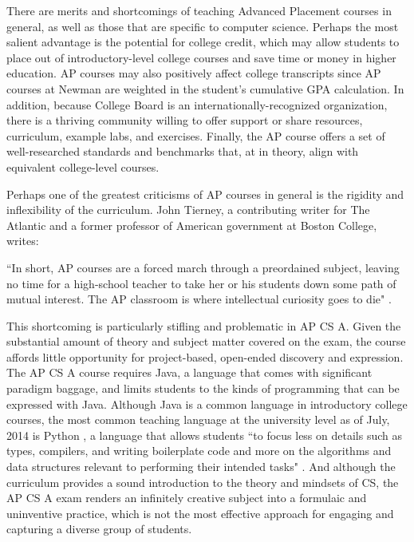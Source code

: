  \label{proconap}
There are merits and shortcomings of teaching Advanced Placement courses in general, as well as those that are specific to computer science. Perhaps the most salient advantage is the potential for college credit, which may allow students to place out of introductory-level college courses and save time or money in higher education. AP courses may also positively affect college transcripts since AP courses at Newman are weighted in the student’s cumulative GPA calculation. In addition, because College Board is an internationally-recognized organization, there is a thriving community willing to offer support or share resources, curriculum, example labs, and exercises. Finally, the AP course offers a set of well-researched standards and benchmarks that, at in theory, align with equivalent college-level courses. \par
Perhaps one of the greatest criticisms of AP courses in general is the rigidity and inflexibility of the curriculum. John Tierney, a contributing writer for The Atlantic and a former professor of American government at Boston College, writes:
\begin{blockquote}
	``In short, AP courses are a forced march through a preordained subject, leaving no time for a high-school teacher to take her or his students down some path of mutual interest. The AP classroom is where intellectual curiosity goes to die" \cite{atlantic}.
	\end{blockquote}
This shortcoming is particularly stifling and problematic in AP CS A. Given the substantial amount of theory and subject matter covered on the exam, the course affords little opportunity for project-based, open-ended discovery and expression. The AP CS A course requires Java, a language that comes with significant paradigm baggage, and limits students to the kinds of programming that can be expressed with Java. Although Java is a common language in introductory college courses, the most common teaching language at the university level as of July, 2014 is Python \cite{unilang}, a language that allows students ``to focus less on details such as types, compilers, and writing boilerplate code and more on the algorithms and data structures relevant to performing their intended tasks" \cite{guo}. And although the curriculum provides a sound introduction to the theory and mindsets of CS, the AP CS A exam renders an infinitely creative subject into a formulaic and uninventive practice, which is not the most effective approach for engaging and capturing a diverse group of students. \par 
